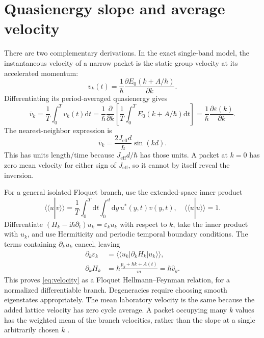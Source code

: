 \documentclass[11pt,oneside]{report}
\numberwithin{equation}{chapter}
\newcommand{\Jeff}{J_{\mathrm{eff}}}
\newcommand{\ii}{\mathrm i}
\newcommand{\dd}{\mathrm d}
\begin{document}
\section{Quasienergy slope and average velocity}
There are two complementary derivations. In the exact single-band model, the instantaneous velocity of a narrow packet is the static group velocity at its accelerated momentum:
\begin{equation}
 v_k(t)=\frac{1}{\hbar}\frac{\partial E_0(k+A/\hbar)}{\partial k}.
\end{equation}
Differentiating its period-averaged quasienergy gives
\begin{equation}
 \overline v_k=\frac1T\int_0^T v_k(t)\dd t
 =\frac1\hbar\frac{\partial}{\partial k}\left[\frac1T\int_0^TE_0(k+A/\hbar)\dd t\right]
 =\frac1\hbar\frac{\partial\varepsilon(k)}{\partial k}.\label{eq:velocity}
\end{equation}
The nearest-neighbor expression is
\begin{equation}\label{eq:velocityNN}
 \boxed{\overline v_k=\frac{2\Jeff d}{\hbar}\sin(kd).}
\end{equation}
This has units length/time because $\Jeff d/\hbar$ has those units. A packet at $k=0$ has zero mean velocity for either sign of $\Jeff$, so it cannot by itself reveal the inversion.

For a general isolated Floquet branch, use the extended-space inner product
\begin{equation}
 \langle\!\langle u|v\rangle\!\rangle=\frac1T\int_0^T\dd t\int_0^d\dd y\,u^*(y,t)v(y,t),\quad \langle\!\langle u|u\rangle\!\rangle=1.
\end{equation}
Differentiate $(H_k-\ii\hbar\partial_t)u_k=\varepsilon_k u_k$ with respect to $k$, take the inner product with $u_k$, and use Hermiticity and periodic temporal boundary conditions. The terms containing $\partial_k u_k$ cancel, leaving
\begin{align}
 \partial_k\varepsilon_k&=\langle\!\langle u_k|\partial_k H_k|u_k\rangle\!\rangle,\\
 \partial_kH_k&=\hbar\frac{p_y+\hbar k+A(t)}{m}=\hbar\hat v_y.
\end{align}
This proves \cref{eq:velocity} as a Floquet Hellmann--Feynman relation, for a normalized differentiable branch. Degeneracies require choosing smooth eigenstates appropriately. The mean laboratory velocity is the same because the added lattice velocity has zero cycle average. A packet occupying many $k$ values has the weighted mean of the branch velocities, rather than the slope at a single arbitrarily chosen $k$ \cite{Arlinghaus2011}.
\end{document}
